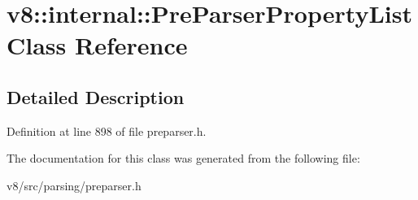 \hypertarget{classv8_1_1internal_1_1PreParserPropertyList}{}\section{v8\+:\+:internal\+:\+:Pre\+Parser\+Property\+List Class Reference}
\label{classv8_1_1internal_1_1PreParserPropertyList}


\subsection{Detailed Description}


Definition at line 898 of file preparser.\+h.



The documentation for this class was generated from the following file\+:\begin{DoxyCompactItemize}
\item 
v8/src/parsing/preparser.\+h\end{DoxyCompactItemize}

